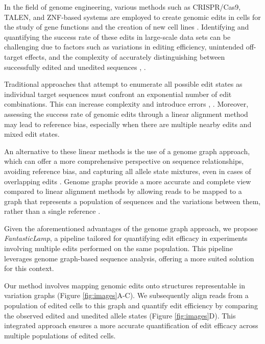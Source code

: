 \documentclass{bioinfo}
\theoremstyle{definition}
\begin{document}
In the field of genome engineering, various methods such as CRISPR/Cas9, TALEN, and ZNF-based systems are employed to create genomic edits in cells for the study of gene functions and the creation of new cell lines \citep{gaj2013zfn}.
Identifying and quantifying the success rate of these edits in large-scale data sets can be challenging due to factors such as variations in editing efficiency, unintended off-target effects, and the complexity of accurately distinguishing between successfully edited and unedited sequences \citep{guell2014genome}, \citep{van2020delivery}.

Traditional approaches that attempt to enumerate all possible edit states as individual target sequences must confront an exponential number of edit combinations.
This can increase complexity and introduce errors \citep{huang2013short}, \citep{mun2021leviosam}.
Moreover, assessing the success rate of genomic edits through a linear alignment method may lead to reference bias, especially when there are multiple nearby edits and mixed edit states.

An alternative to these linear methods is the use of a genome graph approach, which can offer a more comprehensive perspective on sequence relationships, avoiding reference bias, and capturing all allele state mixtures, even in cases of overlapping edits \citep{eggertsson2017graphtyper,Martiniano_2020}.
Genome graphs provide a more accurate and complete view compared to linear alignment methods by allowing reads to be mapped to a graph that represents a population of sequences and the variations between them, rather than a single reference \citep{garrison2018variation,paten2017genome,Eizenga_2020}.

Given the aforementioned advantages of the genome graph approach, we propose \textit{FantasticLamp}, a pipeline tailored for quantifying edit efficacy in experiments involving multiple edits performed on the same population.
This pipeline leverages genome graph-based sequence analysis, offering a more suited solution for this context.

Our method involves mapping genomic edits onto structures representable in variation graphs (Figure \ref{fig:images}A-C).
We subsequently align reads from a population of edited cells to this graph and quantify edit efficiency by comparing the observed edited and unedited allele states (Figure \ref{fig:images}D).
This integrated approach ensures a more accurate quantification of edit efficacy across multiple populations of edited cells.
\end{document}
